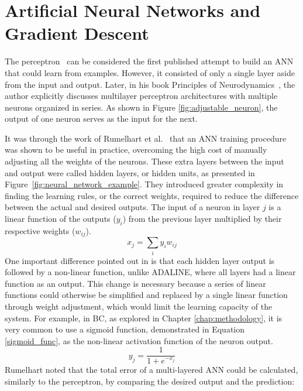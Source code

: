 \section{Artificial Neural Networks and Gradient Descent}
\label{sec_neural_networks}
The perceptron~\cite{rosenblatt1958perceptron} can be considered the first published attempt to build an \gls{ANN} that could learn from examples. However, it consisted of only a single layer aside from the input and output. Later, in his book Principles of Neurodynamics~\cite{Rosenblatt1963PRINCIPLESON}, the author explicitly discusses multilayer perceptron architectures with multiple neurons organized in series. As shown in Figure \ref{fig:adjustable_neuron}, the output of one neuron serves as the input for the next.

It was through the work of Rumelhart et al.~\cite{Rumelhart1986LearningRB} that an \gls{ANN} training procedure was shown to be useful in practice, overcoming the high cost of manually adjusting all the weights of the neurons. These extra layers between the input and output were called hidden layers, or hidden units, as presented in Figure~\ref{fig:neural_network_example}. They introduced greater complexity in finding the learning rules, or the correct weights, required to reduce the difference between the actual and desired outputs. The input of a neuron in layer $j$ is a linear function of the outputs ($y_i$) from the previous layer multiplied by their respective weights ($w_{ij}$).
\begin{equation} 
    x_j = \sum_{i} y_i w_{ij} 
\end{equation}
One important difference pointed out in \cite{Rumelhart1986LearningRB} is that each hidden layer output is followed by a non-linear function, unlike \gls{ADALINE}, where all layers had a linear function as an output. This change is necessary because a series of linear functions could otherwise be simplified and replaced by a single linear function through weight adjustment, which would limit the learning capacity of the system.
For example, in \gls{BC}, as explored in Chapter \ref{chap:methodology}, it is very common to use a sigmoid function, demonstrated in Equation \ref{sigmoid_func}, as the non-linear activation function of the neuron output.
\begin{equation}
     y_j = \frac{1}{1 + e^{-x_j}} \label{sigmoid_func}
\end{equation}
Rumelhart noted that the total error of a multi-layered \gls{ANN} could be calculated, similarly to the perceptron, by comparing the desired output and the prediction:
